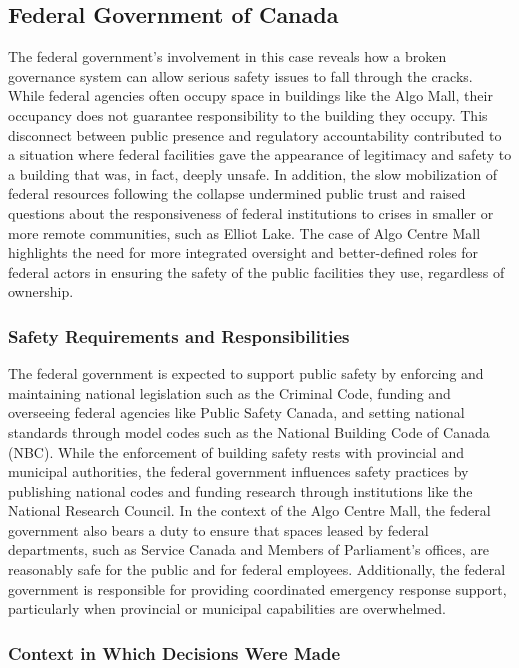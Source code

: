 \documentclass[12pt]{article}
\begin{document}
\subsection{Federal Government of Canada}

The federal government's involvement in this case reveals how a broken governance system can allow serious safety issues to fall through the cracks. While federal agencies often occupy space in buildings like the Algo Mall, their occupancy does not guarantee responsibility to the building they occupy. This disconnect between public presence and regulatory accountability contributed to a situation where federal facilities gave the appearance of legitimacy and safety to a building that was, in fact, deeply unsafe. In addition, the slow mobilization of federal resources following the collapse undermined public trust and raised questions about the responsiveness of federal institutions to crises in smaller or more remote communities, such as Elliot Lake. The case of Algo Centre Mall highlights the need for more integrated oversight and better-defined roles for federal actors in ensuring the safety of the public facilities they use, regardless of ownership.

\subsubsection*{Safety Requirements and Responsibilities}

The federal government is expected to support public safety by enforcing and maintaining national legislation such as the Criminal Code, funding and overseeing federal agencies like Public Safety Canada, and setting national standards through model codes such as the National Building Code of Canada (NBC). While the enforcement of building safety rests with provincial and municipal authorities, the federal government influences safety practices by publishing national codes and funding research through institutions like the National Research Council. In the context of the Algo Centre Mall, the federal government also bears a duty to ensure that spaces leased by federal departments, such as Service Canada and Members of Parliament's offices, are reasonably safe for the public and for federal employees. Additionally, the federal government is responsible for providing coordinated emergency response support, particularly when provincial or municipal capabilities are overwhelmed.

\subsubsection*{Context in Which Decisions Were Made}
\end{document}
